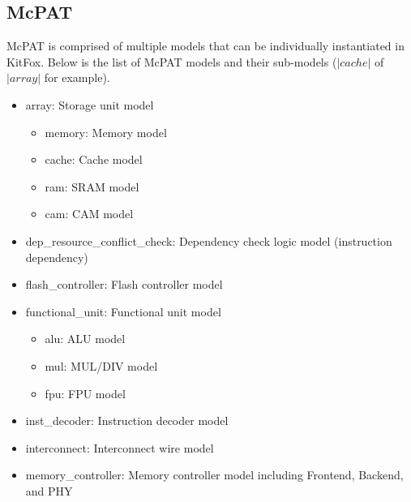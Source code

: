 \pagebreak
\subsection{McPAT}
\noindent
McPAT is comprised of multiple models that can be individually instantiated in KitFox.
Below is the list of McPAT models and their sub-models ($|cache|$ of $|array|$ for example).
\begin{itemize}
\item{array: Storage unit model\vspace*{-5pt}\leavevmode
\begin{itemize}
\item{memory: Memory model} \vspace*{-5pt}\leavevmode
\item{cache: Cache model} \vspace*{-5pt}\leavevmode
\item{ram: SRAM model} \vspace*{-5pt}\leavevmode
\item{cam: CAM model} \vspace*{-5pt}\leavevmode
\end{itemize}
}
\item{dep\_resource\_conflict\_check: Dependency check logic model (instruction dependency)} \vspace*{-5pt}\leavevmode
\item{flash\_controller: Flash controller model} \vspace*{-5pt}\leavevmode
\item{functional\_unit: Functional unit model \vspace*{-5pt}\leavevmode
\begin{itemize}
\item{alu: ALU model} \vspace*{-5pt}\leavevmode
\item{mul: MUL/DIV model} \vspace*{-5pt}\leavevmode
\item{fpu: FPU model} \vspace*{-5pt}\leavevmode
\end{itemize}
}
\item{inst\_decoder: Instruction decoder model} \vspace*{-5pt}\leavevmode
\item{interconnect: Interconnect wire model} \vspace*{-5pt}\leavevmode
\item{memory\_controller: Memory controller model including Frontend, Backend, and PHY} \vspace*{-5pt}\leavevmode

\end{itemize}
